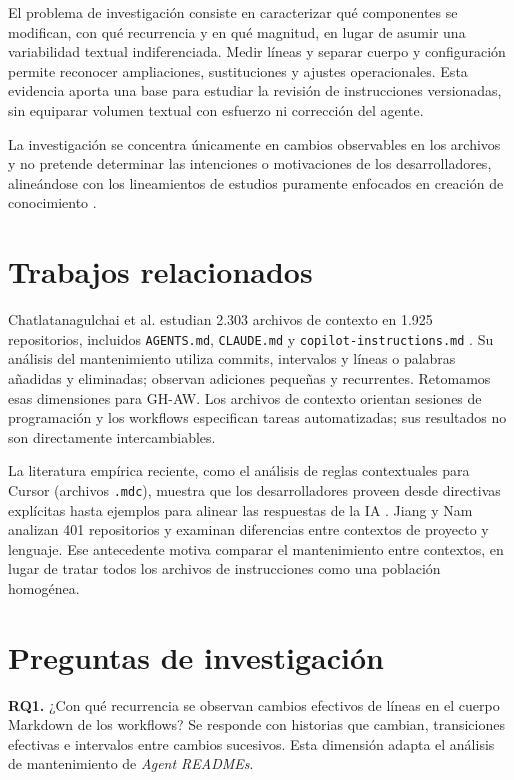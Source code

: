 \documentclass[conference,a4paper]{IEEEtran}
\newcommand{\corr}[1]{{\color{correccion}#1}}
\begin{document}
\corr{El problema de investigación consiste en caracterizar qué componentes se modifican, con qué recurrencia y en qué magnitud, en lugar de asumir una variabilidad textual indiferenciada. Medir líneas y separar cuerpo y configuración permite reconocer ampliaciones, sustituciones y ajustes operacionales. Esta evidencia aporta una base para estudiar la revisión de instrucciones versionadas, sin equiparar volumen textual con esfuerzo ni corrección del agente.}

La investigación se concentra únicamente en cambios observables en los archivos y no pretende determinar las intenciones o motivaciones de los desarrolladores, alineándose con los lineamientos de estudios puramente enfocados en creación de conocimiento \cite{stol2018}.

\section{Trabajos relacionados}
Chatlatanagulchai et al. estudian 2.303 archivos de contexto en 1.925 repositorios, incluidos \texttt{AGENTS.md}, \texttt{CLAUDE.md} y \texttt{copilot-instructions.md} \cite{agentreadmes}. Su análisis del mantenimiento utiliza commits, intervalos y líneas o palabras añadidas y eliminadas; observan adiciones pequeñas y recurrentes. Retomamos esas dimensiones para GH-AW. Los archivos de contexto orientan sesiones de programación y los workflows especifican tareas automatizadas; sus resultados no son directamente intercambiables.

La literatura empírica reciente, como el análisis de reglas contextuales para Cursor (archivos \texttt{.mdc}), muestra que los desarrolladores proveen desde directivas explícitas hasta ejemplos para alinear las respuestas de la IA \cite{jiang2026}. Jiang y Nam analizan 401 repositorios y examinan diferencias entre contextos de proyecto y lenguaje. \corr{Ese antecedente motiva comparar el mantenimiento entre contextos, en lugar de tratar todos los archivos de instrucciones como una población homogénea.}

\section{Preguntas de investigación}
\corr{\textbf{RQ1.} ¿Con qué recurrencia se observan cambios efectivos de líneas en el cuerpo Markdown de los workflows?} Se responde con historias que cambian, transiciones efectivas e intervalos entre cambios sucesivos. Esta dimensión adapta el análisis de mantenimiento de \textit{Agent READMEs}.
\end{document}
